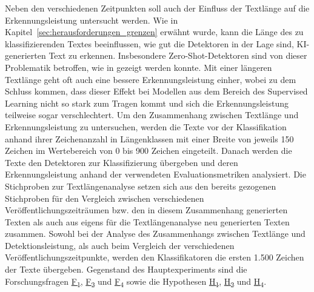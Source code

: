 Neben den verschiedenen Zeitpunkten soll auch der Einfluss der Textlänge auf die Erkennungsleistung untersucht werden. Wie in Kapitel~\ref{sec:herausforderungen_grenzen} erwähnt wurde, kann die Länge des zu klassifizierenden Textes beeinflussen, wie gut die Detektoren in der Lage sind, KI-generierten Text zu erkennen. Insbesondere Zero-Shot-Detektoren sind von dieser Problematik betroffen, wie in \autocite{bao2024fastdetectgptefficientzeroshotdetection} gezeigt werden konnte. Mit einer längeren Textlänge geht oft auch eine bessere Erkennungsleistung einher, wobei \autocite{bao2024fastdetectgptefficientzeroshotdetection} zu dem Schluss kommen, dass dieser Effekt bei Modellen aus dem Bereich des Supervised Learning nicht so stark zum Tragen kommt und sich die Erkennungsleistung teilweise sogar verschlechtert. Um den Zusammenhang zwischen Textlänge und Erkennungsleistung zu untersuchen, werden die Texte vor der Klassifikation anhand ihrer Zeichenanzahl in Längenklassen mit einer Breite von jeweils 150 Zeichen im Wertebereich von 0 bis 900 Zeichen eingeteilt. Danach werden die Texte den Detektoren zur Klassifizierung übergeben und deren Erkennungsleistung anhand der verwendeten Evaluationsmetriken analysiert. Die Stichproben zur Textlängenanalyse setzen sich aus den bereits gezogenen Stichproben für den Vergleich zwischen verschiedenen Veröffentlichungszeiträumen bzw. den in diesem Zusammenhang generierten Texten als auch aus eigens für die Textlängenanalyse neu generierten Texten zusammen. Sowohl bei der Analyse des Zusammenhangs zwischen Textlänge und Detektionsleistung, als auch beim Vergleich der verschiedenen Veröffentlichungszeitpunkte, werden den Klassifikatoren die ersten 1.500 Zeichen der Texte übergeben.
Gegenstand des Hauptexperiments sind die Forschungsfragen \hyperlink{rq:1}{F\textsubscript{1}}, \hyperlink{rq:2}{F\textsubscript{2}} und \hyperlink{rq:4}{F\textsubscript{4}} sowie die Hypothesen \hyperlink{hp:1}{H\textsubscript{1}}, \hyperlink{hp:2}{H\textsubscript{2}} und \hyperlink{hp:4}{H\textsubscript{4}}.


